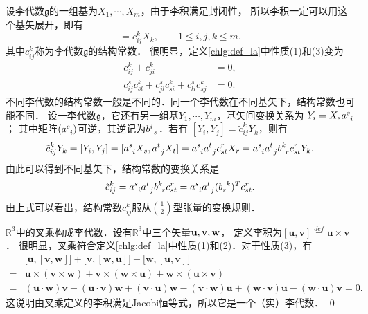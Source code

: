 设李代数$\mathfrak{g}$的一组基为$X_1, \cdots ,X_m$，由于李积满足封闭性，
所以李积一定可以用这个基矢展开，即有
\begin{equation}
    [X_i, X_j] =c_{ij}^k X_k, \qquad 1 \leqslant i,j,k \leqslant m .
\end{equation}
其中$c_{ij}^k$称为李代数$\mathfrak{g}$的{\heiti 结构常数}．
很明显，定义\ref{chlg:def_la}中性质(1)和(3)变为
\begin{align}
    c_{ij}^k +c_{ji}^k &= 0, \label{chlg:eqn_Cij=Cji} \\
    c_{ij}^s c_{sl}^k + c_{jl}^s c_{si}^k + c_{li}^s c_{sj}^k &=0. \label{chlg:eqn_CCC}
\end{align}
不同李代数的结构常数一般是不同的．同一个李代数在不同基矢下，结构常数也可能不同．
设一李代数$\mathfrak{g}$，它还有另一组基$Y_1, \cdots ,Y_m$，基矢间变换关系为
$    Y_i = X_s a_{\hphantom{s} i}^s  $；
其中矩阵$(a_{\hphantom{s} i}^s)$可逆，其逆记为$b_{\hphantom{s} s}^i$．若有
$    [Y_i, Y_j] =\tilde{c}^{k}_{ij} Y_k $，则有
\begin{equation}
    \tilde{c}^{k}_{ij} Y_k= [Y_i, Y_j] = [a_{\hphantom{s} i}^s X_s, a_{\hphantom{s} j}^t X_t]
    =a_{\hphantom{s} i}^s a_{\hphantom{s} j}^t c_{st}^r X_r
    =a_{\hphantom{s} i}^s a_{\hphantom{s} j}^t b^k_{\hphantom{s} r} c_{st}^r Y_k .
\end{equation}
由此可以得到不同基矢下，结构常数的变换关系是
\begin{equation}\label{chlg:eqn_LAC-trans}
    \tilde{c}^{k}_{ij}  =a_{\hphantom{s} i}^s a_{\hphantom{s} j}^t b^k_{\hphantom{s} r} c_{st}^r 
    =a_{\hphantom{s} i}^s a_{\hphantom{s} j}^t (b^{\hphantom{s} k}_{r})^T c_{st}^r  .
\end{equation}
由上式可以看出，结构常数$c^k_{ij}$服从$\binom{1}{2}$型张量的变换规则．

\begin{example}
    $\mathbb{R}^3$中的叉乘构成李代数．设有$\mathbb{R}^3$中三个矢量$\bf u, v, w$，
    定义李积为$[\boldsymbol{u},\boldsymbol{v}]\overset{def}{=}\boldsymbol{u} \times \boldsymbol{v}$．
    很明显，叉乘符合定义\ref{chlg:def_la}中性质(1)和(2)．对于性质(3)，有
    \begin{align*}
        &\bigl[\boldsymbol{u},[\boldsymbol{v},\boldsymbol{w}]\bigr]
        +\bigl[\boldsymbol{v},[\boldsymbol{w},\boldsymbol{u}]\bigr]+\bigl[\boldsymbol{w},
        [\boldsymbol{u},\boldsymbol{v}]\bigr] \\
      =& \boldsymbol{u} \times (\boldsymbol{v}\times \boldsymbol{w})+\boldsymbol{v} \times 
      (\boldsymbol{w}\times \boldsymbol{u})+\boldsymbol{w} \times (\boldsymbol{u}\times \boldsymbol{v}) \\
      =& (\boldsymbol{u}\cdot\boldsymbol{w}) \boldsymbol{v}  - (\boldsymbol{u}\cdot\boldsymbol{v}) \boldsymbol{w}
        +(\boldsymbol{v}\cdot\boldsymbol{u}) \boldsymbol{w}  - (\boldsymbol{v}\cdot\boldsymbol{w}) \boldsymbol{u}
        +(\boldsymbol{w}\cdot\boldsymbol{v}) \boldsymbol{u}  - (\boldsymbol{w}\cdot\boldsymbol{u}) \boldsymbol{v} = 0 .
    \end{align*}
    这说明由叉乘定义的李积满足Jacobi恒等式，所以它是一个（实）李代数． \qed
\end{example}

